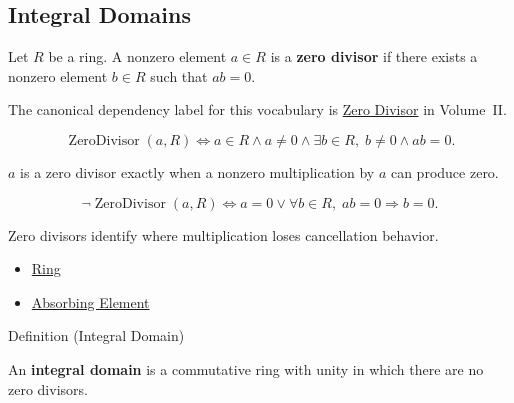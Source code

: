 \subsection*{Integral Domains}
\label{subsec:integral-domains}

\begin{definition*}
Let $R$ be a ring.
A nonzero element $a\in R$ is a \textbf{zero divisor} if there exists a
nonzero element $b\in R$ such that $ab=0$.
\end{definition*}

\begin{remark*}
The canonical dependency label for this vocabulary is
\hyperref[def:zero-divisor]{Zero Divisor} in Volume~II.
\end{remark*}

\begin{remark*}
\[
\operatorname{ZeroDivisor}(a,R)
\Longleftrightarrow
a\in R
\land a\neq 0
\land
\exists b\in R,\; b\neq 0 \land ab=0.
\]
\end{remark*}

\begin{remark*}
$a$ is a zero divisor exactly when a nonzero multiplication by $a$ can produce
zero.
\end{remark*}

\begin{remark*}
\[
\neg\operatorname{ZeroDivisor}(a,R)
\Longleftrightarrow
a=0
\lor
\forall b\in R,\; ab=0 \Rightarrow b=0.
\]
\end{remark*}

\begin{remark*}[Interpretation]
Zero divisors identify where multiplication loses cancellation behavior.
\end{remark*}

\begin{dependencies}
\begin{itemize}
  \item \hyperref[def:algebraic-ring]{Ring}
  \item \hyperref[def:algebraic-absorbing-element]{Absorbing Element}
\end{itemize}
\end{dependencies}

\begin{definitionbox}{Definition (Integral Domain)}
\begin{definition}
\label{def:algebraic-integral-domain}
An \textbf{integral domain} is a commutative ring with unity in which there are
no zero divisors.
\end{definition}
\end{definitionbox}

